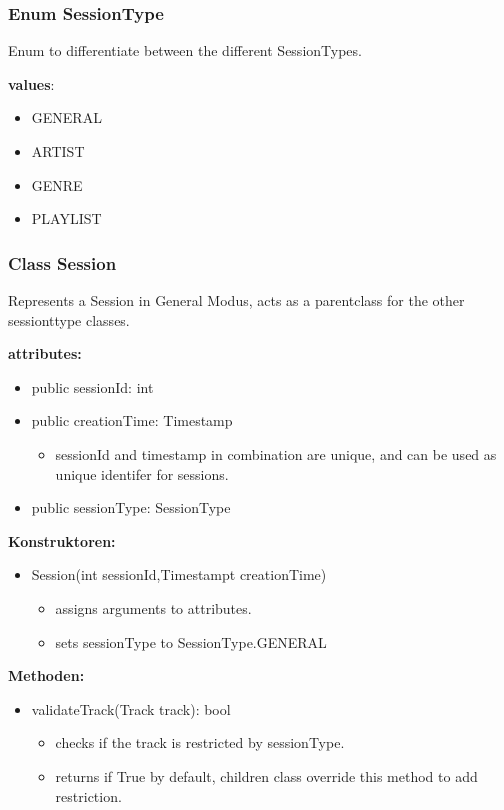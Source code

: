 \documentclass[oneside, nenglish]{sdqtechreport}
\begin{document}
\subsubsection{Enum SessionType}

Enum to differentiate between the different SessionTypes.

\textbf{values}:
\begin{itemize}
    \item GENERAL
    \item ARTIST
    \item GENRE
    \item PLAYLIST
\end{itemize}

\subsubsection{Class Session}
Represents a Session in General Modus, acts as a parentclass for the other sessionttype classes.

\textbf{attributes:}
\begin{itemize}
    \item public sessionId: int        
    \item public creationTime: Timestamp 
    \begin{itemize}
        \item sessionId and timestamp in combination are unique, and can be used as unique identifer for sessions.
    \end{itemize}
    \item public sessionType: SessionType
\end{itemize}

\textbf{Konstruktoren:}
\begin{itemize}
    \item Session(int sessionId,Timestampt creationTime)
    \begin{itemize}
        \item assigns arguments to attributes.
        \item sets sessionType to SessionType.GENERAL
    \end{itemize}
\end{itemize}
\textbf{Methoden:}
\begin{itemize}
    \item validateTrack(Track track): bool 
    \begin{itemize}
        \item checks if the track is restricted by sessionType.  
        \item returns if True by default, children class override this method to add restriction.
    \end{itemize}
    
\end{itemize}
\end{document}
